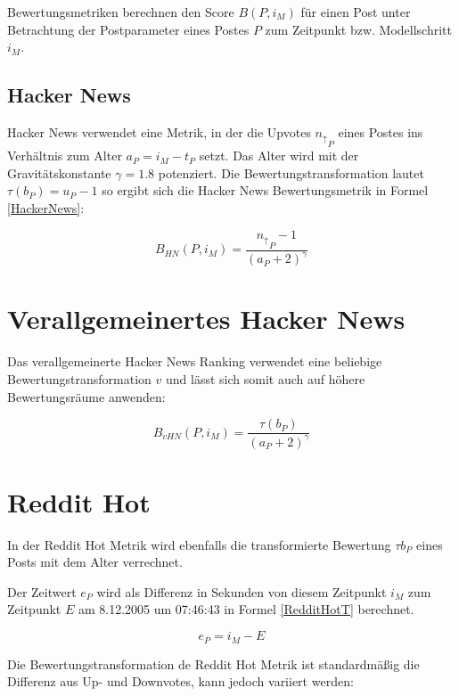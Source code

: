Bewertungsmetriken berechnen den Score $B(P,i_M)$ für einen Post unter Betrachtung der Postparameter eines Postes $P$ zum Zeitpunkt bzw. Modellschritt $i_M$.
	
\subsection{Hacker News}
\label{seqHackerNews}

Hacker News verwendet eine Metrik, in der die Upvotes ${n_\uparrow}_{P}$ eines Postes ins Verhältnis zum Alter $a_{P} = i_M - t_P$ setzt. Das Alter wird mit der Gravitätskonstante $\gamma = 1.8$ potenziert. Die Bewertungstransformation lautet $\tau(b_P) = u_P - 1$ so ergibt sich die Hacker News Bewertungsmetrik in Formel \ref{HackerNews}:
 
\begin{equation}
\label{HackerNews}
B_{HN}(P,i_M) = \frac{{n_\uparrow}_P - 1}{(a_P + 2)^{\gamma}}
\end{equation}

\section{Verallgemeinertes Hacker News}
\label{seqvHackerNews}
Das verallgemeinerte Hacker News Ranking verwendet eine beliebige Bewertungstransformation $v$ und lässt sich somit auch auf höhere Bewertungsräume anwenden:

\begin{equation}
\label{vHackerNews}
B_{vHN}(P,i_M) = \frac{\tau(b_P)}{(a_P + 2)^{\gamma}}
\end{equation}


\section{Reddit Hot}


In der Reddit Hot Metrik wird ebenfalls die transformierte Bewertung $\tau{b_P}$ eines Posts mit dem Alter verrechnet.

Der Zeitwert $e_P$ wird als Differenz in Sekunden von diesem Zeitpunkt $i_M$ zum Zeitpunkt $E$ am 8.12.2005 um 07:46:43 in Formel \ref{RedditHotT} berechnet.

\begin{equation}
\label{RedditHotT}
e_{P} = i_{M} - E  
\end{equation}

Die Bewertungstransformation de Reddit Hot Metrik ist standardmäßig die  Differenz aus Up- und Downvotes, kann jedoch variiert werden:

